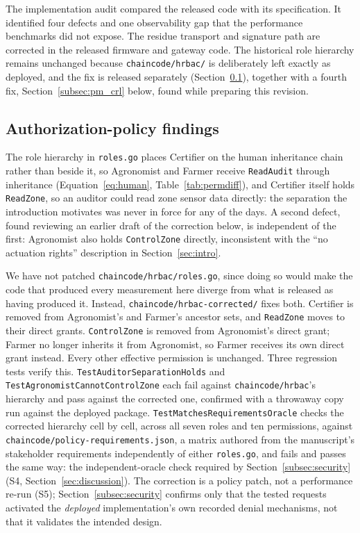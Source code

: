 \documentclass[a4paper,fleqn]{cas-sc}
\begin{document}
The implementation audit compared the released code with its specification.
It identified four defects and one observability gap that the performance
benchmarks did not expose. The residue transport and signature path are
corrected in the released firmware and gateway code. The historical role
hierarchy remains unchanged because \texttt{chaincode/hrbac/} is
deliberately left exactly as deployed, and the fix is released separately
(Section~\ref{subsec:pm_policy}), together with a fourth fix,
Section~\ref{subsec:pm_crl} below, found while preparing this revision.

\subsection{Authorization-policy findings}
\label{subsec:pm_policy}

The role hierarchy in \texttt{roles.go} places Certifier on the human
inheritance chain rather than beside it, so Agronomist and Farmer receive
\texttt{ReadAudit} through inheritance (Equation~\eqref{eq:human},
Table~\ref{tab:permdiff}), and Certifier itself holds \texttt{ReadZone}, so
an auditor could read zone sensor data directly: the separation the
introduction motivates was never in force for any of the \DeployDays{}
days. A second defect, found reviewing an earlier draft of the correction
below, is independent of the first: Agronomist also holds
\texttt{ControlZone} directly, inconsistent with the ``no actuation
rights'' description in Section~\ref{sec:intro}.

We have not patched \texttt{chaincode/hrbac/roles.go}, since doing so
would make the code that produced every measurement here diverge from
what is released as having produced it. Instead,
\texttt{chaincode/hrbac-corrected/} fixes both. Certifier is removed from
Agronomist's and Farmer's ancestor sets, and \texttt{ReadZone} moves to
their direct grants. \texttt{ControlZone} is removed from Agronomist's
direct grant; Farmer no longer inherits it from Agronomist, so Farmer
receives its own direct grant instead. Every other effective permission is
unchanged. Three regression tests verify this.
\texttt{TestAuditorSeparationHolds} and
\texttt{TestAgronomistCannotControlZone} each fail against
\texttt{chaincode/hrbac}'s hierarchy and pass against the corrected one,
confirmed with a throwaway copy run against the deployed package.
\texttt{TestMatchesRequirementsOracle} checks the corrected hierarchy cell
by cell, across all seven roles and ten permissions, against
\texttt{chaincode/policy-requirements.json}, a matrix authored from the
manuscript's stakeholder requirements independently of either
\texttt{roles.go}, and fails and passes the same way: the independent-oracle
check required by Section~\ref{subsec:security} (S4,
Section~\ref{sec:discussion}). The correction is a policy patch, not a
performance re-run (S5); Section~\ref{subsec:security} confirms only that
the tested requests activated the \emph{deployed} implementation's own
recorded denial mechanisms, not that it validates the intended design.
\end{document}
